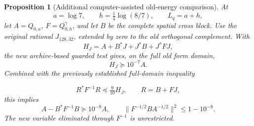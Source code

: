 \documentclass[11pt]{article}
\newtheorem{proposition}[theorem]{Proposition}
\theoremstyle{remark}\newtheorem{remark}[theorem]{Remark}
\begin{document}
\begin{proposition}[Additional computer-assisted old-energy comparison]
\label{prop:old-energy-comparison}
At
\[
 a=\log7,\qquad h=\tfrac14\log(8/7),\qquad L_q=a+h,
\]
let \(A=Q_{0,a}\), \(F=Q^\gamma_{0,h}\), and let \(B\) be the complete spatial
cross block. Use the original rational \(J_{128,32}\), extended by zero to the
old orthogonal complement. With
\[
 H_J=A+B^*J+J^*B+J^*FJ,
\]
the new archive-based guarded test gives, on the full old form domain,
\begin{equation}\label{eq:full-old-mu}
 H_J\succeq10^{-7}A.
\end{equation}
Combined with the previously established full-domain inequality

\[
 R^*F^{-1}R\preceq\tfrac9{10}H_J,\qquad R=B+FJ,
\]
this implies
\begin{equation}\label{eq:full-old-retention}
 A-B^*F^{-1}B\succeq10^{-8}A,
 \qquad
 \|F^{-1/2}BA^{-1/2}\|^2\le1-10^{-8}.
\end{equation}
The new variable eliminated through \(F^{-1}\) is unrestricted.
\end{proposition}
\end{document}
